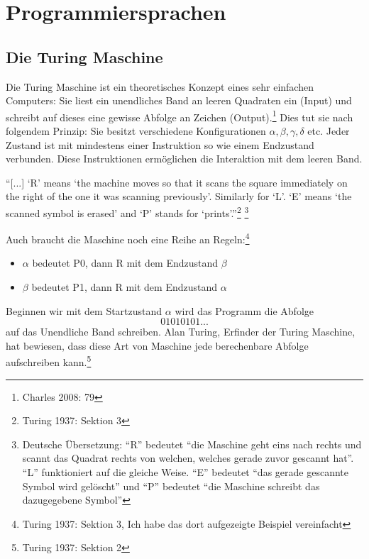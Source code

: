 \documentclass[10pt,a4paper]{article}
\begin{document}
\section{Programmiersprachen}
\subsection{Die Turing Maschine}
Die Turing Maschine ist ein theoretisches Konzept eines sehr einfachen Computers: Sie liest ein unendliches Band an leeren Quadraten ein (Input) und schreibt auf dieses eine gewisse Abfolge an Zeichen (Output).\footnote{Charles 2008: 79} Dies tut sie nach folgendem Prinzip: Sie besitzt verschiedene Konfigurationen $\alpha, \beta, \gamma, \delta$ etc. Jeder Zustand ist mit mindestens einer Instruktion so wie einem Endzustand verbunden. Diese Instruktionen ermöglichen die Interaktion mit dem leeren Band. 
\begin{displayquote}
\enquote{[...] \enquote{R} means \enquote{the machine moves
so that it scans the square immediately on the right of the one it was
scanning previously}. Similarly for \enquote{L}. \enquote{E} means \enquote{the scanned
symbol is erased} and \enquote{P} stands for \enquote{prints}.}\footnote{Turing 1937: Sektion 3} \footnote{Deutsche Übersetzung: \enquote{R} bedeutet \enquote{die Maschine geht eins nach rechts und scannt das Quadrat rechts von welchen, welches gerade zuvor gescannt hat}. \enquote{L} funktioniert auf die gleiche Weise. \enquote{E} bedeutet \enquote{das gerade gescannte Symbol wird gelöscht} und \enquote{P} bedeutet \enquote{die Maschine schreibt das dazugegebene Symbol}}
\end{displayquote}
Auch braucht die Maschine noch eine Reihe an Regeln:\footnote{Turing 1937: Sektion 3, Ich habe das dort aufgezeigte Beispiel vereinfacht}
\begin{itemize}
    \item $\alpha$ bedeutet P0, dann R mit dem Endzustand $\beta$
    \item $\beta$ bedeutet P1, dann R mit dem Endzustand $\alpha$
\end{itemize}
Beginnen wir mit dem Startzustand $\alpha$ wird das Programm die Abfolge $$01010101...$$ auf das Unendliche Band schreiben. Alan Turing, Erfinder der Turing Maschine, hat bewiesen, dass diese Art von Maschine jede berechenbare Abfolge aufschreiben kann.\footnote{Turing 1937: Sektion 2}
\end{document}
